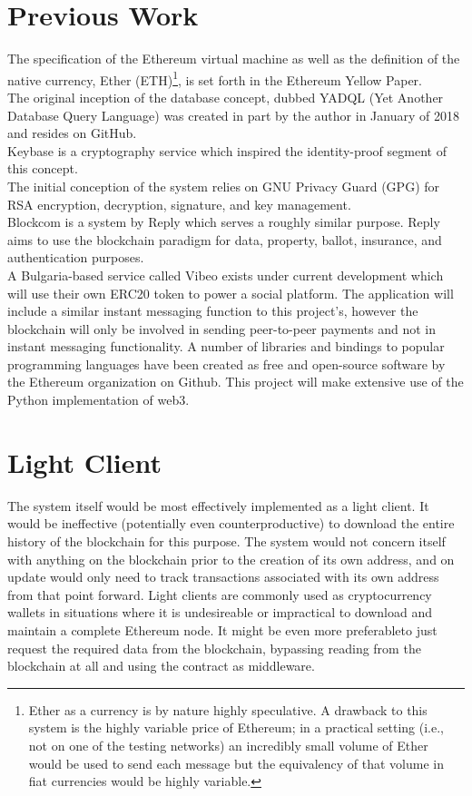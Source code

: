 \documentclass[]{article}
\begin{document}
\section{Previous Work}
The specification of the Ethereum virtual machine as well as the definition of the native currency, Ether (ETH)\footnote{Ether as a currency is by nature highly speculative. A drawback to this system is the highly variable price of Ethereum; in a practical setting (i.e., not on one of the testing networks) an incredibly small volume of Ether would be used to send each message but the equivalency of that volume in fiat currencies would be highly variable.}, is set forth in the Ethereum Yellow Paper.\cite{yellowpaper}\\
The original inception of the database concept, dubbed YADQL (Yet Another Database Query Language) was created in part by the author in January of 2018 and resides on GitHub.\cite{yadql}\\
Keybase is a cryptography service which inspired the identity-proof segment of this concept.\cite{keybase}\\
The initial conception of the system relies on GNU Privacy Guard (GPG) for RSA encryption, decryption, signature, and key management\cite{gpg}.\\
Blockcom is a system by Reply which serves a roughly similar purpose. Reply aims to use the blockchain paradigm for data, property, ballot, insurance, and authentication purposes.\cite{reply}\\
A Bulgaria-based service called Vibeo exists under current development which will use their own ERC20 token to power a social platform. The application will include a similar instant messaging function to this project's, however the blockchain will only be involved in sending peer-to-peer payments and not in instant messaging functionality.\cite{vibeo}
A number of libraries and bindings to popular programming languages have been created as free and open-source software by the Ethereum organization on Github.\cite{ethereum} This project will make extensive use of the Python implementation of web3.\cite{web3-py}

\section{Light Client}
The system itself would be most effectively implemented as a light client. It would be ineffective (potentially even counterproductive) to download the entire history of the blockchain for this purpose. The system would not concern itself with anything on the blockchain prior to the creation of its own address, and on update would only need to track transactions associated with its own address from that point forward. Light clients are commonly used as cryptocurrency wallets in situations where it is undesireable or impractical to download and maintain a complete Ethereum node. It might be even more preferableto just request the required data from the blockchain, bypassing reading from the blockchain at all and using the contract as middleware.
\end{document}
